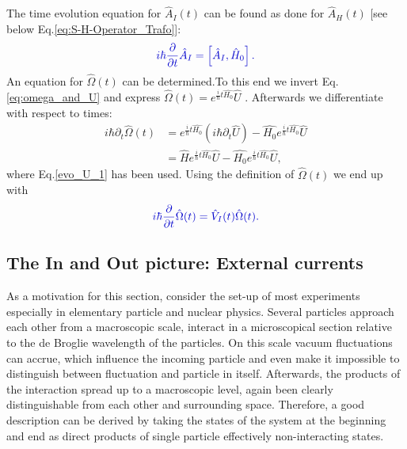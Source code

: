\documentclass[12pt, titlepage]{article}
\begin{document}
The time evolution equation for $ 	\hat{A}_{I}(t) $ can be found as done for $ \hat{A}_{H}(t) $ $ [ $see below Eq.\eqref{eq:S-H-Operator_Trafo}]:
\begin{equation}\label{eq:time_evo_equ_Intera}
\textcolor[RGB]{0,0,204}{
	i\hbar
	\frac{\partial}{\partial t}
	\hat{A}_{I}
	=
	\left[ 
	\hat{A}_{I},
	\hat{H}_{0}
	\right] .
}
\end{equation}
An equation for $ \hat{\Omega}(t) $ can be determined.To this end we invert Eq.\eqref{eq:omega_and_U} and express $  \hat{\Omega}(t) 
  		= e^{\frac{i}{\hbar}t \hat{H_{0}}}
			\hat{U}  $ . Afterwards we differentiate with respect to times: 
\begin{subequations}
\begin{align}
  		i\hbar\partial_{t}\hat{\Omega}(t) 
  		 &= 
  		 e^{\frac{i}{\hbar}t\hat{H_{0}}}
  		 \left(i\hbar\partial_{t}\hat{U} \right)
  		 -
  		 \hat{H_{0}}
   		 e^{\frac{i}{\hbar}t\hat{H_{0}}}
 		 \hat{U}
  		 \\
  		 &=
  		 \hat{H}
  		  e^{\frac{i}{\hbar}t\hat{H_{0}}}  		 
  		 \hat{U}  		 
  		 -
  		 \hat{H_{0}}
  		   e^{\frac{i}{\hbar}t\hat{H_{0}}}
  		 \hat{U},
\end{align}
\end{subequations}
where Eq.\eqref{evo_U_1} has been used. Using the definition of $ \hat{\Omega}(t) $ we end up with
\begin{equation}\label{eq:time_evo_Omega_interaction}
\textcolor[RGB]{0,0,204}{
	i\hbar
	\frac{\partial}{\partial t}
	\hat{\Omega}(t)
	=
	\hat{V}_{I}(t)
	\hat{\Omega}(t)
.}
\end{equation}
\subsection{The In and Out picture: External currents}
As a motivation for this section, consider the set-up of most experiments especially in elementary particle and nuclear physics. Several particles approach each other from a macroscopic scale, interact in a microscopical section relative to the de Broglie wavelength of the particles. On this scale vacuum fluctuations can accrue, which influence the incoming particle and even make it impossible to distinguish between fluctuation and particle in itself. Afterwards, the products of the interaction spread up to a macroscopic level, again been clearly distinguishable from each other and surrounding space. Therefore, a good description can be derived by taking the states of the system at the beginning and end as direct products of single particle effectively non-interacting states.
\end{document}
